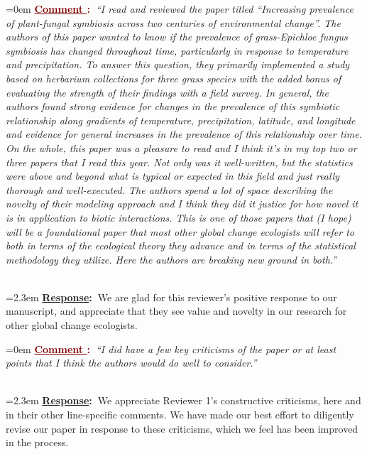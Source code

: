 \documentclass[12pt]{article}
\newcounter{cN}
\newcommand{\comment}[1]{
	\vspace{2em}
	\refstepcounter{cN} %
	\noindent \hangindent=0em \textbf{\textcolor{Maroon}{\uline{Comment \thecN}:~}}\emph{``#1''}
	}
\newcommand{\response}[1]{
	\\[0.25em]
	\hangindent=2.3em \textbf{\textcolor{NavyBlue}{\uline{Response}:~}}#1
	}
\begin{document}
\comment{I read and reviewed the paper titled “Increasing prevalence of plant-fungal symbiosis across two centuries of environmental change”. The authors of this paper wanted to know if the prevalence of grass-Epichloe fungus symbiosis has changed throughout time, particularly in response to temperature and precipitation. To answer this question, they primarily implemented a study based on herbarium collections for three grass species with the added bonus of evaluating the strength of their findings with a field survey. In general, the authors found strong evidence for changes in the prevalence of this symbiotic relationship along gradients of temperature, precipitation, latitude, and longitude and evidence for general increases in the prevalence of this relationship over time.\\
On the whole, this paper was a pleasure to read and I think it’s in my top two or three papers that I read this year. Not only was it well-written, but the statistics were above and beyond what is typical or expected in this field and just really thorough and well-executed. The authors spend a lot of space describing the novelty of their modeling approach and I think they did it justice for how novel it is in application to biotic interactions. This is one of those papers that (I hope) will be a foundational paper that most other global change ecologists will refer to both in terms of the ecological theory they advance and in terms of the statistical methodology they utilize. Here the authors are breaking new ground in both.}
\response{We are glad for this reviewer's positive response to our manuscript, and appreciate that they see value and novelty in our research for other global change ecologists.  }


\comment{I did have a few key criticisms of the paper or at least points that I think the authors would do well to consider.}
\response{We appreciate Reviewer 1's constructive criticisms, here and in their other line-specific comments. We have made our best effort to diligently revise our paper in response to these criticisms, which we feel has been improved in the process.}
\end{document}
